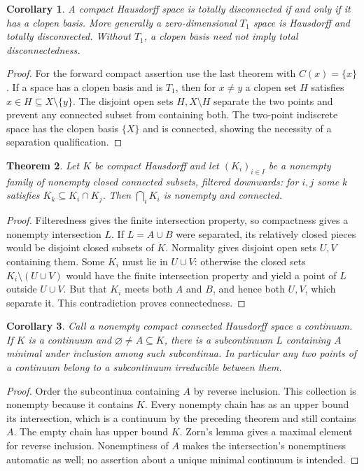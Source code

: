 \documentclass[11pt,oneside,openany]{book}
\newtheorem{theorem}{Theorem}[chapter]
\newtheorem{corollary}[theorem]{Corollary}
\theoremstyle{definition}
\theoremstyle{remark}
\begin{document}
\begin{corollary}\label{d10:06:zero-dimensional}
A compact Hausdorff space is totally disconnected if and only if it has a clopen basis. More generally a zero-dimensional $T_1$ space is Hausdorff and totally disconnected. Without $T_1$, a clopen basis need not imply total disconnectedness.
\end{corollary}
\begin{proof}
For the forward compact assertion use the last theorem with $C(x)=\{x\}$. If a space has a clopen basis and is $T_1$, then for $x\ne y$ a clopen set $H$ satisfies $x\in H\subseteq X\setminus\{y\}$. The disjoint open sets $H,X\setminus H$ separate the two points and prevent any connected subset from containing both. The two-point indiscrete space has the clopen basis $\{X\}$ and is connected, showing the necessity of a separation qualification.
\end{proof}

\begin{theorem}\label{d10:06:filtered-continua}
Let $K$ be compact Hausdorff and let $(K_i)_{i\in I}$ be a nonempty family of nonempty closed connected subsets, filtered downwards: for $i,j$ some $k$ satisfies $K_k\subseteq K_i\cap K_j$. Then $\bigcap_iK_i$ is nonempty and connected.
\end{theorem}
\begin{proof}
Filteredness gives the finite intersection property, so compactness gives a nonempty intersection $L$. If $L=A\cup B$ were separated, its relatively closed pieces would be disjoint closed subsets of $K$. Normality gives disjoint open sets $U,V$ containing them. Some $K_i$ must lie in $U\cup V$: otherwise the closed sets $K_i\setminus(U\cup V)$ would have the finite intersection property and yield a point of $L$ outside $U\cup V$. But that $K_i$ meets both $A$ and $B$, and hence both $U,V$, which separate it. This contradiction proves connectedness.
\end{proof}

\begin{corollary}\label{d10:06:irreducible-continuum}
Call a nonempty compact connected Hausdorff space a continuum. If $K$ is a continuum and $\varnothing\ne A\subseteq K$, there is a subcontinuum $L$ containing $A$ minimal under inclusion among such subcontinua. In particular any two points of a continuum belong to a subcontinuum irreducible between them.
\end{corollary}
\begin{proof}
Order the subcontinua containing $A$ by reverse inclusion. This collection is nonempty because it contains $K$. Every nonempty chain has as an upper bound its intersection, which is a continuum by the preceding theorem and still contains $A$. The empty chain has upper bound $K$. Zorn's lemma gives a maximal element for reverse inclusion. Nonemptiness of $A$ makes the intersection's nonemptiness automatic as well; no assertion about a unique minimal continuum is intended.
\end{proof}
\end{document}
